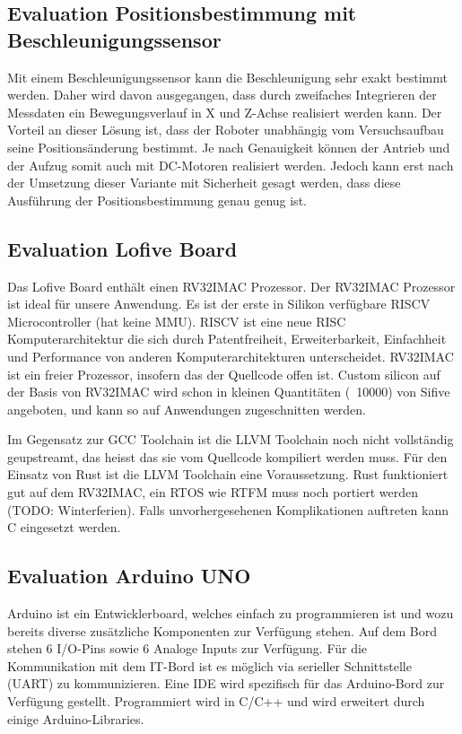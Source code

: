 \documentclass[a4paper]{report}
\begin{document}
\subsection{Evaluation Positionsbestimmung mit Beschleunigungssensor}
\label{app:ssec:EvalPosBestBeschleunigung}
Mit einem Beschleunigungssensor kann die Beschleunigung sehr exakt bestimmt werden. Daher wird davon ausgegangen, dass durch zweifaches Integrieren der Messdaten ein Bewegungsverlauf in X und Z-Achse realisiert werden kann. Der Vorteil an dieser Lösung ist, dass der Roboter unabhängig vom Versuchsaufbau seine Positionsänderung bestimmt. Je nach Genauigkeit können der Antrieb und der Aufzug somit auch mit DC-Motoren realisiert werden. Jedoch kann erst nach der Umsetzung dieser Variante mit Sicherheit gesagt werden, dass diese Ausführung der Positionsbestimmung genau genug ist.

\subsection{Evaluation Lofive Board}
\label{app:ssec:EvalLofive}
Das Lofive Board enthält einen RV32IMAC Prozessor. Der RV32IMAC Prozessor ist
ideal für unsere Anwendung. Es ist der erste in Silikon verfügbare RISCV
Microcontroller (hat keine MMU). RISCV ist eine neue RISC Komputerarchitektur
die sich durch Patentfreiheit, Erweiterbarkeit, Einfachheit und Performance von
anderen Komputerarchitekturen unterscheidet. RV32IMAC ist ein freier Prozessor,
insofern das der Quellcode offen ist. Custom silicon auf der Basis von RV32IMAC
wird schon in kleinen Quantitäten (~10000) von Sifive angeboten, und kann so
auf Anwendungen zugeschnitten werden.

Im Gegensatz zur GCC Toolchain ist die LLVM Toolchain noch nicht vollständig
geupstreamt, das heisst das sie vom Quellcode kompiliert werden muss. Für den
Einsatz von Rust ist die LLVM Toolchain eine Voraussetzung. Rust funktioniert
gut auf dem RV32IMAC, ein RTOS wie RTFM muss noch portiert werden (TODO:
Winterferien). Falls unvorhergesehenen Komplikationen auftreten kann C
eingesetzt werden.

\subsection{Evaluation Arduino UNO}
\label{app:ssec:ArduinoUno}
Arduino ist ein Entwicklerboard, welches einfach zu programmieren ist und wozu bereits diverse zusätzliche Komponenten zur Verfügung stehen. Auf dem Bord stehen 6 I/O-Pins sowie 6 Analoge Inputs zur Verfügung. Für die Kommunikation mit dem IT-Bord ist es möglich via serieller Schnittstelle (UART) zu kommunizieren. Eine IDE wird spezifisch für das Arduino-Bord zur Verfügung gestellt. Programmiert wird in C/C++ und wird erweitert durch einige Arduino-Libraries.
\end{document}

